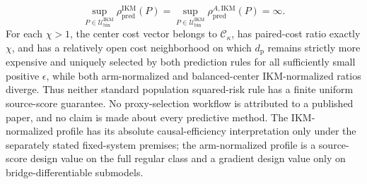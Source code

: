 \[
 \sup_{P\in\mathcal U_{\mathrm{bin}}^{\mathrm{IKM}}}
 \rho_{\mathrm{pred}}^{\mathrm{IKM}}(P)
 =\sup_{P\in\mathcal U_{\mathrm{bin}}^{\mathrm{IKM}}}
 \rho_{\mathrm{pred}}^{A,\mathrm{IKM}}(P)=\infty.
\]
For each \(\chi>1\), the center cost vector belongs to \(\mathcal C_\kappa\), has paired-cost ratio exactly \(\chi\), and has a relatively open cost neighborhood on which \(d_{\mathrm p}\) remains strictly more expensive and uniquely selected by both prediction rules for all sufficiently small positive \(\epsilon\), while both arm-normalized and balanced-center IKM-normalized ratios diverge.  Thus neither standard population squared-risk rule has a finite uniform source-score guarantee.  No proxy-selection workflow is attributed to a published paper, and no claim is made about every predictive method.  The IKM-normalized profile has its absolute causal-efficiency interpretation only under the separately stated fixed-system premises; the arm-normalized profile is a source-score design value on the full regular class and a gradient design value only on bridge-differentiable submodels.